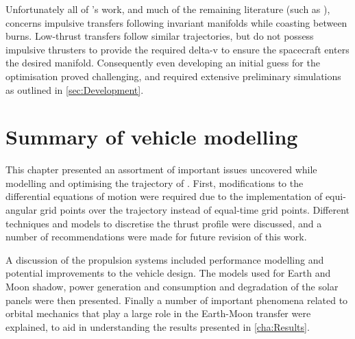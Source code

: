 Unfortunately all of \citeauthor{Belbruno2004}'s work, and much of the remaining literature (such as \textcite{Koon2001, Parker2008}), concerns impulsive transfers following invariant manifolds while coasting between burns. Low-thrust transfers follow similar trajectories, but do not possess impulsive thrusters to provide the required delta-v to ensure the spacecraft enters the desired manifold. Consequently even developing an initial guess for the optimisation proved challenging, and required extensive preliminary simulations as outlined in \autoref{sec:Development}.

 

\section{Summary of vehicle modelling} \label{sec:Summary-vehicle}

This chapter presented an assortment of important issues uncovered while modelling and optimising the trajectory of \BW. First, modifications to the differential equations of motion were required due to the implementation of equi-angular grid points over the trajectory instead of equal-time grid points. Different techniques and models to discretise the thrust profile were discussed, and a number of recommendations were made for future revision of this work. 

A discussion of the propulsion systems included performance modelling and potential improvements to the vehicle design. The models used for Earth and Moon shadow, power generation and consumption and degradation of the solar panels were then presented. Finally a number of important phenomena related to orbital mechanics that play a large role in the Earth-Moon transfer were explained, to aid in understanding the results presented in \autoref{cha:Results}.